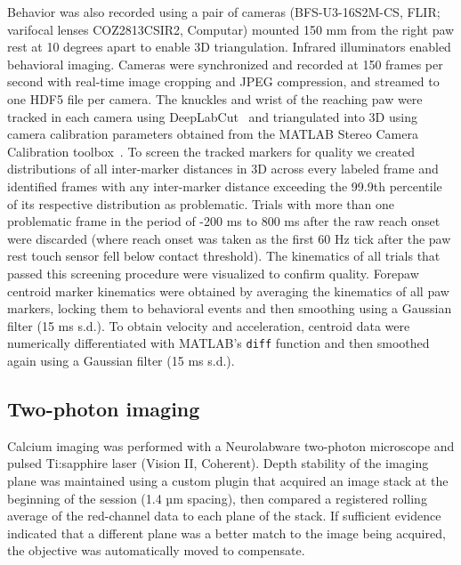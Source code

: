 \documentclass{article}
\begin{document}
Behavior was also recorded using a pair of cameras (BFS-U3-16S2M-CS, FLIR; varifocal lenses COZ2813CSIR2, Computar) mounted 150 mm from the right paw rest at 10 degrees apart to enable 3D triangulation. Infrared illuminators enabled behavioral imaging. Cameras were synchronized and recorded at 150 frames per second with real-time image cropping and JPEG compression, and streamed to one HDF5 file per camera. The knuckles and wrist of the reaching paw were tracked in each camera using DeepLabCut~\cite{mathis2018deeplabcut} and triangulated into 3D using camera calibration parameters obtained from the MATLAB Stereo Camera Calibration toolbox~\cite{heikkila1997four,zhang2000flexible}. To screen the tracked markers for quality we created distributions of all inter-marker distances in 3D across every labeled frame and identified frames with any inter-marker distance exceeding the 99.9th percentile of its respective distribution as problematic. Trials with more than one problematic frame in the period of -200 ms to 800 ms after the raw reach onset were discarded (where reach onset was taken as the first 60 Hz tick after the paw rest touch sensor fell below contact threshold). The kinematics of all trials that passed this screening procedure were visualized to confirm quality. Forepaw centroid marker kinematics were obtained by averaging the kinematics of all paw markers, locking them to behavioral events and then smoothing using a Gaussian filter (15 ms s.d.). To obtain velocity and acceleration, centroid data were numerically differentiated with MATLAB’s \texttt{diff} function and then smoothed again using a Gaussian filter (15 ms s.d.).

\subsection{Two-photon imaging}

Calcium imaging was performed with a Neurolabware two-photon microscope and pulsed Ti:sapphire laser (Vision II, Coherent). Depth stability of the imaging plane was maintained using a custom plugin that acquired an image stack at the beginning of the session (1.4 µm spacing), then compared a registered rolling average of the red-channel data to each plane of the stack. If sufficient evidence indicated that a different plane was a better match to the image being acquired, the objective was automatically moved to compensate.
\end{document}
